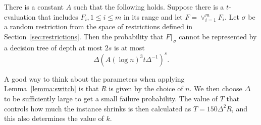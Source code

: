 \documentclass{article}\usepackage[a4paper,margin=20mm]{geometry}
\begin{document}
\begin{lemma} \label{lemma:switch}
There is a constant $A$ such that the
following holds.
Suppose there is a $t$-evaluation that includes $F_i, 1\leq i \leq m$
in its range and let $F =  \lor_{i=1}^m F_i$.
Let $\sigma$ be a random restriction from the 
space of restrictions defined in Section~\ref{sec:restrictions}.
Then the probability that $F\lceil_\sigma$
cannot be represented by a decision tree of depth at most $2s$
is at most
$$
\Delta (A(\log n)^{3} t \Delta^{-1})^{s}.$$
\end{lemma}

\begin{remark}
A good way to think about the parameters when applying 
Lemma~\ref{lemma:switch} is that $R$ is given
by the choice of $n$.  We then choose $\Delta$ to
be sufficiently large to get a small failure probability.
The value of $T$ that controls how much the instance
shrinks is then calculated as $T= 150 \Delta^2 R$,
and this also determines the value of $k$.
\end{remark}
\end{document}
